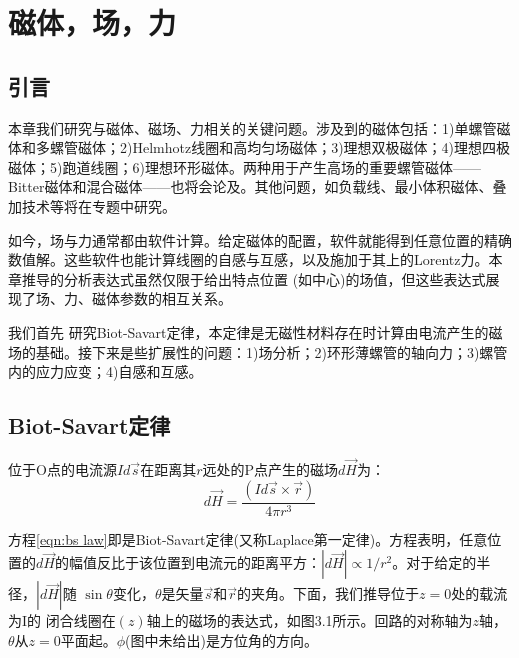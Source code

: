 \chapter{磁体，场，力}
\section{引言}
本章我们研究与磁体、磁场、力相关的关键问题。涉及到的磁体包括：1)单螺管磁体和多螺管磁体；2)Helmhotz线圈和高均匀场磁体；3)理想双极磁体；4)理想四极磁体；5)跑道线圈；6)理想环形磁体。两种用于产生高场的重要螺管磁体——Bitter磁体和混合磁体——也将会论及。其他问题，如负载线、最小体积磁体、叠加技术等将在专题中研究。

如今，场与力通常都由软件计算。给定磁体的配置，软件就能得到任意位置的精确数值解。这些软件也能计算线圈的自感与互感，以及施加于其上的Lorentz力。本章推导的分析表达式虽然仅限于给出特点位置
(如中心)的场值，但这些表达式展现了场、力、磁体参数的相互关系。

我们首先 研究Biot-Savart定律，本定律是无磁性材料存在时计算由电流产生的磁场的基础。接下来是些扩展性的问题：1)场分析；2)环形薄螺管的轴向力；3)螺管内的应力应变；4)自感和互感。

\section{Biot-Savart定律}
位于O点的电流源$Id\vec{s}$在距离其$r$远处的P点产生的磁场$d\vec{H}$为：
\begin{equation}\label{eqn:bs law}
  d\vec{H}=\frac{(Id\vec{s}\times \vec{r})}{4\pi r^3}
\end{equation}

方程\ref{eqn:bs law}即是Biot-Savart定律(又称Laplace第一定律)。方程表明，任意位置的$d\vec{H}$的幅值反比于该位置到电流元的距离平方：$|d\vec{H}|\propto 1/r^2$。对于给定的半径，$|d\vec{H}|$随
$\sin\theta$变化，$\theta$是矢量$\vec{s}$和$\vec{r}$的夹角。下面，我们推导位于$z=0$处的载流为I的
闭合线圈在$(z)$轴上的磁场的表达式，如图3.1所示。回路的对称轴为$z$轴，$\theta$从$z=0$平面起。$\phi$(图中未给出)是方位角的方向。

